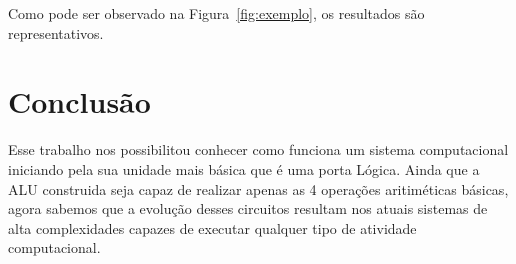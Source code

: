 \documentclass[
12pt,
openright,
oneside,
a4paper,
chapter=TITLE,
english,
brazil,
colorlinks=true,
linkcolor=blue,
citecolor=blue,
filecolor=magenta,
urlcolor=blue
]{abntex2}
\begin{document}
	Como pode ser observado na Figura~\ref{fig:exemplo}, os resultados são representativos.
	
	\chapter{Conclusão}
	
    Esse trabalho nos possibilitou conhecer como funciona um sistema computacional iniciando pela sua unidade mais básica que é uma porta Lógica.  Ainda que a ALU construida seja capaz de realizar apenas as 4 operações aritiméticas básicas, agora sabemos que a evolução desses circuitos resultam nos atuais sistemas de alta complexidades capazes de executar qualquer tipo de atividade computacional.
    
	
	\cleardoublepage
	
	
	
\end{document}
